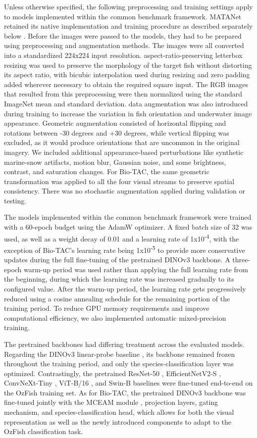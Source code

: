 \documentclass[preprint,12pt]{elsarticle}
\begin{document}
Unless otherwise specified, the following preprocessing and training
settings apply to models implemented within the common benchmark
framework. MATANet retained its native implementation and training
procedure as described separately below
\citep{ref26}. Before the images were passed to
the models, they had to be prepared using preprocessing and augmentation
methods. The images were all converted into a standardized 224x224 input
resolution. aspect-ratio-preserving letterbox resizing was used to
preserve the morphology of the target fish without distorting its aspect
ratio, with bicubic interpolation used during resizing and zero padding
added wherever necessary to obtain the required square input. The RGB
images that resulted from this preprocessing were then normalized using
the standard ImageNet mean and standard deviation. data augmentation was
also introduced during training to increase the variation in fish
orientation and underwater image appearance. Geometric augmentation
consisted of horizontal flipping and rotations between -30 degrees and
+30 degrees, while vertical flipping was excluded, as it would produce
orientations that are uncommon in the original imagery. We included
additional appearance-based perturbations like synthetic marine-snow
artifacts, motion blur, Gaussian noise, and some brightness, contrast,
and saturation changes. For Bio-TAC, the same geometric
transformation was applied to all the four visual streams to preserve
spatial consistency. There was no stochastic augmentation applied during
validation or testing.

The models implemented within the common benchmark framework were
trained with a 60-epoch budget using the AdamW optimizer. A fixed batch
size of 32 was used, as well as a weight decay of 0.01 and a learning
rate of 1x10\textsuperscript{-4}, with the exception of Bio-TAC's
learning rate being 1x10\textsuperscript{-5} to provide more
conservative updates during the full fine-tuning of the pretrained
DINOv3 backbone. A three-epoch warm-up period was used rather than
applying the full learning rate from the beginning, during which the
learning rate was increased gradually to its configured value. After the
warm-up period, the learning rate gets progressively reduced using a
cosine annealing schedule for the remaining portion of the training
period. To reduce GPU memory requirements and improve computational
efficiency, we also implemented automatic mixed-precision training.

The pretrained backbones had differing treatment across the evaluated
models. Regarding the DINOv3 linear-probe baseline
\citep{ref25}, its backbone remained frozen
throughout the training period, and only the species-classification
layer was optimized. Contrastingly, the pretrained ResNet-50
\citep{ref39}, EfficientNetV2-S
\citep{ref40}, ConvNeXt-Tiny
\citep{ref41}, ViT-B/16
\citep{ref36}, and Swin-B
\citep{ref38} baselines were fine-tuned
end-to-end on the OzFish training set. As for Bio-TAC, the
pretrained DINOv3 backbone \citep{ref25} was
fine-tuned jointly with the MCEAM module
\citep{ref26}, projection layers, gating
mechanism, and species-classification head, which allows for both the
visual representation as well as the newly introduced components to
adapt to the OzFish classification task.
\end{document}
